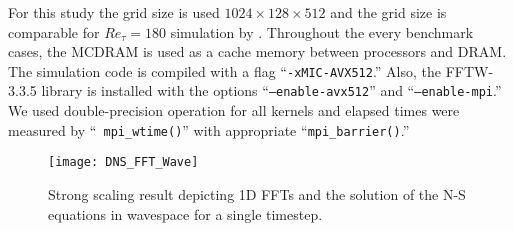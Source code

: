 For this study the grid size is used $1024\times128\times512$ and the
grid size is comparable for $Re_\tau = 180$ simulation by
\cite{Kim:1987ub}. Throughout the every benchmark cases, the MCDRAM is
used as a cache memory between processors and DRAM. The simulation code
is compiled with a flag ``{\tt -xMIC-AVX512}.'' Also, the FFTW-3.3.5
library is installed with the options ``{\tt --enable-avx512}'' and
``{\tt --enable-mpi}.'' \cite{Frigo:2005tu} We used double-precision
operation for all kernels and elapsed times were measured by ``{\tt
mpi\_wtime()}'' with appropriate ``{\tt mpi\_barrier()}.'' 

\begin{figure}
 \begin{center}
   \texttt{[image: DNS\_FFT\_Wave]}
   \caption{Strong scaling result depicting 1D FFTs and the solution of the 
  N-S equations in wavespace for a single timestep.}
   \label{fig:DNS_strong_scale_fft_wave}
 \end{center}
\end{figure}

